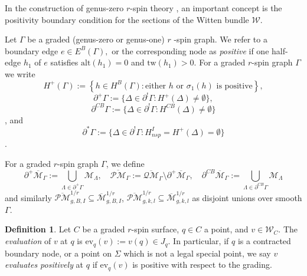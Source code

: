 \documentclass[11pt]{amsart}
\theoremstyle{definition}
\newtheorem{definition}[dummy]{Definition}
\theoremstyle{remark}
\newcommand{\oPM}{{\overline{\mathcal{PM}}}^{1/r}}
\newcommand{\oPMb}{{\overline{\mathcal{PM}}}}
\newcommand{\oQMb}{{\overline{\mathcal{QM}}}}
\newcommand{\<}{\left<}
\renewcommand{\>}{\right>}
\numberwithin{equation}{section}
\def\Mbar{{\overline{\mathcal M}}}
\begin{document}
In %
the construction of genus-zero $r$-spin theory \cite{BCT2,TZ2}, an important concept is the positivity boundary condition for the sections of the Witten bundle $\mathcal W$.


Let $\Gamma$ be a graded (genus-zero or genus-one) $r$%
-spin graph. We refer %
to a boundary %
edge $e\in E^B(\Gamma),$ or %
the %
corresponding node as %
\textit{positive} if one half-edge $h_1$ of $e$ satisfies ${\text{alt}}(h_1) = 0$ and $\text{tw}(h_1) >0$.  For a graded $r$-spin graph $\Gamma$ we %
write $$H^+(\Gamma):=\left\{h\in H^B(\Gamma)\colon \text{either $h$ or $\sigma_1(h)$ is positive}\right\},$$ 
$$\partial^{+} \Gamma:=\{ {\Delta} \in \partial^{!} \Gamma \colon H^+({\Delta})\ne \emptyset \},$$
$$\partial^{CB} \Gamma:=\{ {\Delta} \in \partial^{!} \Gamma \colon H^{CB}({\Delta})\ne \emptyset \}$$,
and
$$
\partial^* \Gamma:= \{ {\Delta} \in \partial^! \Gamma \colon H^I_{nsp}=H^+({\Delta})= \emptyset \}
$$.


For %
a graded $r$-spin graph $\Gamma$, we define
\[ \partial^+\Mbar_\Gamma:=\bigcup_{\Lambda\in\partial^+\Gamma}{\mathcal{M}}_\Lambda, \quad  \oPMb_\Gamma:= \oQMb_\Gamma\setminus
\partial^+\Mbar_\Gamma,\quad \partial^{CB}\Mbar_\Gamma:=\bigcup_{\Lambda\in\partial^{CB}\Gamma}{\mathcal{M}}_\Lambda\]
and similarly $\oPM_{g,B,I}\subseteq \Mbar^{1/r}_{g,B,I}$, $\oPM_{g,k,l}\subseteq \Mbar^{1/r}_{g,k,l}$ as disjoint unions over smooth $\Gamma$.




\begin{definition}
Let $C$ be a graded $r$-spin surface, $q\in C$ a point, and $v\in{\mathcal{W}}_C$. The \textit{evaluation} of $v$ at $q$ is $\text{ev}_q(v) := v(q) \in J_q$. In particular, if $q$ is a contracted boundary node, or a point on $\Sigma$ which is not a legal special point, we say $v$ \textit{evaluates positively} at $q$ if $\text{ev}_q(v)$ is positive with respect to the grading.
\end{definition}
\end{document}
